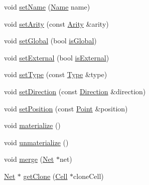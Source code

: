 \begin{DoxyCompactItemize}
void \mbox{\hyperlink{classHurricane_1_1Net_a1a39702b9f4d26ba29ad0dafcdddf840}{set\+Name}} (\mbox{\hyperlink{classHurricane_1_1Name}{Name}} name)
\item 
void \mbox{\hyperlink{classHurricane_1_1Net_af5dfdca4401902ee7e1e46a1a486da38}{set\+Arity}} (const \mbox{\hyperlink{classHurricane_1_1Net_a3a242d929e0c733f90f3f69be8cc427b}{Arity}} \&arity)
\item 
void \mbox{\hyperlink{classHurricane_1_1Net_a35c84afd9dade0cb715602bcf8ec8865}{set\+Global}} (bool \mbox{\hyperlink{classHurricane_1_1Net_a332e9b311809f75fc0fa3a5f36acebcc}{is\+Global}})
\item 
void \mbox{\hyperlink{classHurricane_1_1Net_a6a30bc8282ce7e4b936e73a11549fedf}{set\+External}} (bool \mbox{\hyperlink{classHurricane_1_1Net_aeeb3735dd7451bc0054dd68ac21aae47}{is\+External}})
\item 
void \mbox{\hyperlink{classHurricane_1_1Net_a83f5ce12291b0ec5ab584d515dd8963c}{set\+Type}} (const \mbox{\hyperlink{classHurricane_1_1Net_1_1Type}{Type}} \&type)
\item 
void \mbox{\hyperlink{classHurricane_1_1Net_ac33d13bb0ddc60f369d5bfcffc4bb0f8}{set\+Direction}} (const \mbox{\hyperlink{classHurricane_1_1Net_1_1Direction}{Direction}} \&direction)
\item 
void \mbox{\hyperlink{classHurricane_1_1Net_a0a3a3232a74ebced14b14029c5199561}{set\+Position}} (const \mbox{\hyperlink{classHurricane_1_1Point}{Point}} \&position)
\item 
void \mbox{\hyperlink{classHurricane_1_1Net_ae46f7e4a9b00b265c06cb6e0ee00b806}{materialize}} ()
\item 
void \mbox{\hyperlink{classHurricane_1_1Net_a9e53a3d54b61f7081263e6d7b4fa81b9}{unmaterialize}} ()
\item 
void \mbox{\hyperlink{classHurricane_1_1Net_a442f62d23364805f39816cd543284886}{merge}} (\mbox{\hyperlink{classHurricane_1_1Net}{Net}} $\ast$net)
\item 
\mbox{\hyperlink{classHurricane_1_1Net}{Net}} $\ast$ \mbox{\hyperlink{classHurricane_1_1Net_a4bd27e6ae22606463491c28437c4068f}{get\+Clone}} (\mbox{\hyperlink{classHurricane_1_1Cell}{Cell}} $\ast$clone\+Cell)
\end{DoxyCompactItemize}
